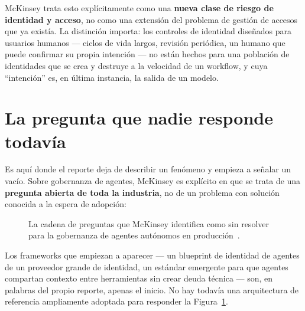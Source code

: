\documentclass[10pt]{article}
\begin{document}
McKinsey trata esto explícitamente como una \textbf{nueva clase de riesgo de identidad y acceso}, no como una extensión del problema de gestión de accesos que ya existía. La distinción importa: los controles de identidad diseñados para usuarios humanos --- ciclos de vida largos, revisión periódica, un humano que puede confirmar su propia intención --- no están hechos para una población de identidades que se crea y destruye a la velocidad de un workflow, y cuya ``intención'' es, en última instancia, la salida de un modelo.

\section{La pregunta que nadie responde todavía}

Es aquí donde el reporte deja de describir un fenómeno y empieza a señalar un vacío. Sobre gobernanza de agentes, McKinsey es explícito en que se trata de una \textbf{pregunta abierta de toda la industria}, no de un problema con solución conocida a la espera de adopción:

\begin{figure}[h]
\centering
{}
\caption{La cadena de preguntas que McKinsey identifica como sin resolver para la gobernanza de agentes autónomos en producción~\cite{mckinsey2026}.}
\label{fig:governance}
\end{figure}

Los frameworks que empiezan a aparecer --- un blueprint de identidad de agentes de un proveedor grande de identidad, un estándar emergente para que agentes compartan contexto entre herramientas sin crear deuda técnica --- son, en palabras del propio reporte, apenas el inicio. No hay todavía una arquitectura de referencia ampliamente adoptada para responder la Figura~\ref{fig:governance}.
\end{document}
